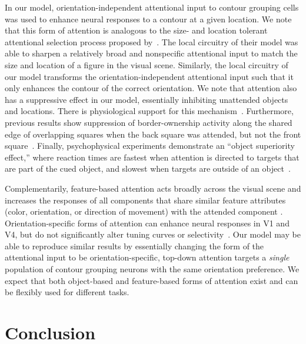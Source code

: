 In our model, orientation-independent attentional input to contour
grouping cells was used to enhance neural responses to a contour at a
given location.  We note that this form of attention is analogous to
the size- and location tolerant attentional selection process proposed
by~\cite{Mihalas_etal11b}. The local circuitry of their model was able
to sharpen a relatively broad and nonspecific attentional input to
match the size and location of a figure in the visual
scene. Similarly, the local circuitry of our model transforms the
orientation-independent attentional input such that it only enhances
the contour of the correct orientation. We note that attention also has a suppressive effect in our model, essentially inhibiting unattended objects and locations. There is physiological support for this mechanism~\citep{Wegener_etal04,Hopf_etal06,Sundberg_etal09,Tsotsos11}. Furthermore, previous results show suppression of border-ownership activity along the shared edge of overlapping squares when the back square was attended, but not the front square~\citep{Qiu_etal07}. Finally, psychophysical experiments demonstrate an ``object superiority effect,'' where reaction times are fastest when attention is directed to targets that are part of the cued object, and slowest when targets are outside of an object~\citep{Egly_etal94,Kimchi_etal07}. 

Complementarily, feature-based attention acts broadly across the visual scene and increases the responses of all components that share similar feature attributes (\eg color, orientation, or direction of movement) with the attended component \citep{Motter94a,Treue_Trujillo99}. Orientation-specific forms of attention can enhance neural responses in V1 and V4, but do not significantly alter tuning curves or selectivity~\citep{McAdams_Maunsell99a}. Our model may be able to reproduce similar results by essentially changing the form of the attentional input to be orientation-specific, \ie top-down attention targets a \emph{single} population of contour grouping neurons with the same orientation preference. We expect that both object-based and feature-based forms of attention exist and can be flexibly used for different tasks.

\section{Conclusion}

